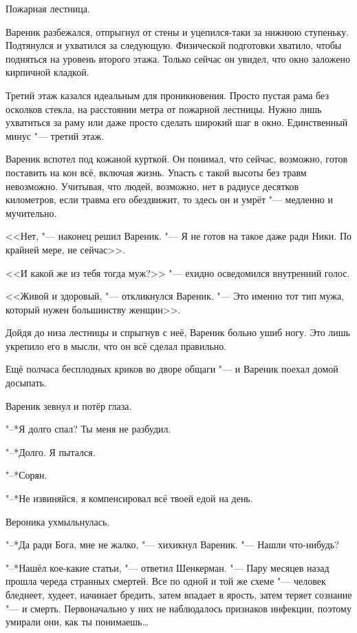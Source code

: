 Пожарная лестница.

Вареник разбежался, отпрыгнул от стены и уцепился-таки за нижнюю ступеньку.
Подтянулся и ухватился за следующую.
Физической подготовки хватило, чтобы подняться на уровень второго этажа.
Только сейчас он увидел, что окно заложено кирпичной кладкой.

Третий этаж казался идеальным для проникновения.
Просто пустая рама без осколков стекла, на расстоянии метра от пожарной лестницы.
Нужно лишь ухватиться за раму или даже просто сделать широкий шаг в окно.
Единственный минус "--- третий этаж.

Вареник вспотел под кожаной курткой.
Он понимал, что сейчас, возможно, готов поставить на кон всё, включая жизнь.
Упасть с такой высоты без травм невозможно.
Учитывая, что людей, возможно, нет в радиусе десятков километров, если травма его обездвижит, то здесь он и умрёт "--- медленно и мучительно.

<<Нет, "--- наконец решил Вареник.
"--- Я не готов на такое даже ради Ники.
По крайней мере, не сейчас>>.

<<И какой же из тебя тогда муж?>> "--- ехидно осведомился внутренний голос.

<<Живой и здоровый, "--- откликнулся Вареник.
"--- Это именно тот тип мужа, который нужен большинству женщин>>.

Дойдя до низа лестницы и спрыгнув с неё, Вареник больно ушиб ногу.
Это лишь укрепило его в мысли, что он всё сделал правильно.

Ещё полчаса бесплодных криков во дворе общаги "--- и Вареник поехал домой досыпать.

\asterism

\textspace

Вареник зевнул и потёр глаза.

"--*Я долго спал?
Ты меня не разбудил.

"--*Долго.
Я пытался.

"--*Сорян.

"--*Не извиняйся, я компенсировал всё твоей едой на день.

Вероника ухмыльнулась.

"--*Да ради Бога, мне не жалко, "--- хихикнул Вареник.
"--- Нашли что-нибудь?

"--*Нашёл кое-какие статьи, "--- ответил Шенкерман.
"--- Пару месяцев назад прошла череда странных смертей.
Все по одной и той же схеме "--- человек бледнеет, худеет, начинает бредить, затем впадает в ярость, затем теряет сознание "--- и смерть.
Первоначально у них не наблюдалось признаков инфекции, поэтому умирали они, как ты понимаешь\ldots{}

